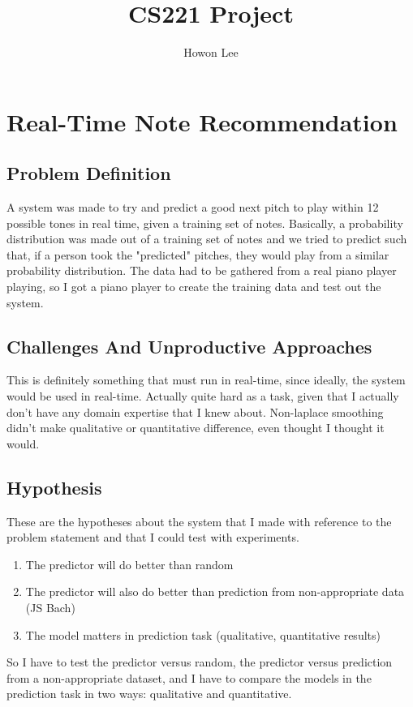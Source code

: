 \documentclass{article}
\begin{document}
\title{CS221 Project}
\author{Howon Lee}
\maketitle
\section*{Real-Time Note Recommendation}

\subsection*{Problem Definition}
A system was made to try and predict a good next pitch to play within 12 possible tones in real time, given a training set of notes. Basically, a probability distribution was made out of a training set of notes and we tried to predict such that, if a person took the "predicted" pitches, they would play from a similar probability distribution.
The data had to be gathered from a real piano player playing, so I got a piano player to create the training data and test out the system.

\subsection*{Challenges And Unproductive Approaches}
This is definitely something that must run in real-time, since ideally, the system would be used in real-time.
Actually quite hard as a task, given that I actually don't have any domain expertise that I knew about.
Non-laplace smoothing didn't make qualitative or quantitative difference, even thought I thought it would.

\subsection*{Hypothesis}
These are the hypotheses about the system that I made with reference to the problem statement and that I could test with experiments.
\begin{enumerate}
    \item The predictor will do better than random
    \item The predictor will also do better than prediction from non-appropriate data (JS Bach)
    \item The model matters in prediction task (qualitative, quantitative results)
\end{enumerate}
So I have to test the predictor versus random, the predictor versus prediction from a non-appropriate dataset, and I have to compare the models in the prediction task in two ways: qualitative and quantitative.
\end{document}
